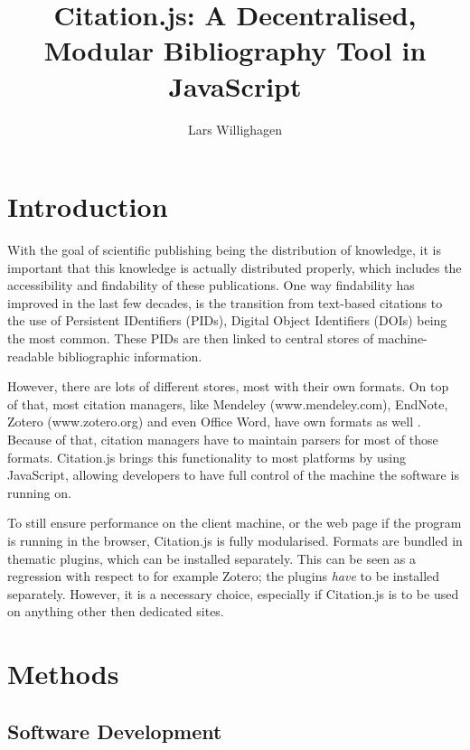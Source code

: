 \documentclass[fleqn,10pt,lineno]{wlpeerj} %
\title{Citation.js: A Decentralised, Modular Bibliography Tool in JavaScript}
\author[1]{Lars Willighagen}
\affil[1]{Eindhoven, The Netherlands}
\begin{document}
\flushbottom
\maketitle
\thispagestyle{empty}

\section*{Introduction}

With the goal of scientific publishing being the distribution of knowledge, it is important that this knowledge is actually distributed properly, which includes the accessibility and findability of these publications. One way findability has improved in the last few decades, is the transition from text-based citations to the use of Persistent IDentifiers (PIDs), Digital Object Identifiers (DOIs) being the most common. These PIDs are then linked to central stores of machine-readable bibliographic information.

However, there are lots of different stores, most with their own formats. On top of that, most citation managers, like Mendeley (www.mendeley.com), EndNote, Zotero (www.zotero.org) and even Office Word, have own formats as well . Because of that, citation managers have to maintain parsers for most of those formats. Citation.js brings this functionality to most platforms by using JavaScript, allowing developers to have full control of the machine the software is running on.

To still ensure performance on the client machine, or the web page if the program is running in the browser, Citation.js is fully modularised. Formats are bundled in thematic plugins, which can be installed separately. This can be seen as a regression with respect to for example Zotero; the plugins \textit{have} to be installed separately. However, it is a necessary choice, especially if Citation.js is to be used on anything other then dedicated sites.


\section*{Methods}

\subsection*{Software Development}
\end{document}
